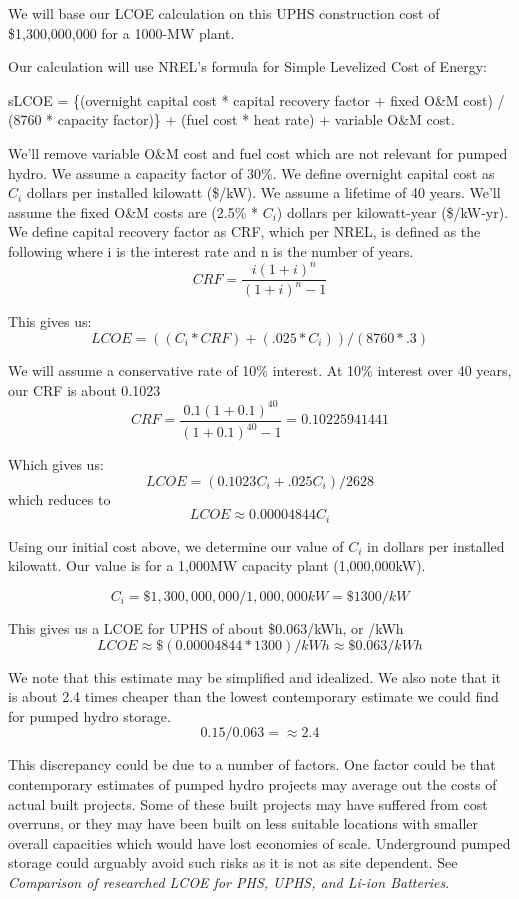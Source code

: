 We will base our LCOE calculation on this UPHS construction cost of \$1,300,000,000 for a 1000-MW plant.

Our calculation will use NREL's formula for Simple Levelized Cost of Energy:

\begin{displayquote}
sLCOE = \{(overnight capital cost * capital recovery factor + fixed O\&M cost) / (8760 * capacity factor)\} + (fuel cost * heat rate) + variable O\&M cost. \cite{SimpleLevelizedCostOfEnergyCalculator}
\end{displayquote}

We'll remove variable O\&M cost and fuel cost which are not relevant for pumped hydro. We assume a capacity factor of 30\%. We define overnight capital cost as $C_i$ dollars per installed kilowatt (\$/kW). We assume a lifetime of 40 years. We'll assume the fixed O\&M costs are (2.5\% * $C_i$) dollars per kilowatt-year (\$/kW-yr). We define capital recovery factor as CRF, which per NREL, is defined as the following where i is the interest rate and n is the number of years.
\[ \displaystyle CRF={\frac {i(1+i)^{n}}{(1+i)^{n}-1}} \]

This gives us:
\[ LCOE = ((C_i * CRF) + (.025 * C_i)) / (8760 * .3) \]

We will assume a conservative rate of 10\% interest. At 10\% interest over 40 years, our CRF is about 0.1023
\[ \displaystyle CRF={\frac {0.1(1+0.1)^{40}}{(1+0.1)^{40}-1}} = 0.10225941441 \]

Which gives us:
\[ LCOE = (0.1023C_i + .025C_i) / 2628 \]
which reduces to
\[ LCOE \approx 0.00004844 C_i \]

Using our initial cost above, we determine our value of $C_i$ in dollars per installed kilowatt. Our value is for a 1,000MW capacity plant (1,000,000kW).

\[ C_i = \$1,300,000,000 / 1,000,000kW = \$1300/kW\]

This gives us a LCOE for UPHS of about \$0.063/kWh, or /kWh
\[ LCOE \approx \$(0.00004844 * 1300)/kWh \approx \$0.063/kWh \]

We note that this estimate may be simplified and idealized. We also note that it is about 2.4 times cheaper than the lowest contemporary estimate we could find for pumped hydro storage.
\[ 0.15 / 0.063 = \approx 2.4\]

This discrepancy could be due to a number of factors. One factor could be that contemporary estimates of pumped hydro projects may average out the costs of actual built projects. Some of these built projects may have suffered from cost overruns, or they may have been built on less suitable locations with smaller overall capacities which would have lost economies of scale. Underground pumped storage could arguably avoid such risks as it is not as site dependent. See \textit{Comparison of researched LCOE for PHS, UPHS, and Li-ion Batteries}.

